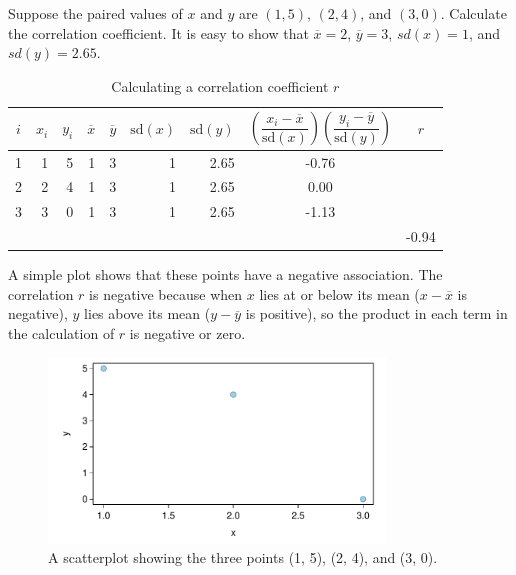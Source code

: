 \begin{example}{Suppose the paired values of $x$ and $y$ are $(1,5)$, $(2,4)$, and $(3,0)$. Calculate the correlation coefficient.} It is easy to show that $\overline{x} = 2$, $\overline{y} = 3$, $sd(x) = 1$, and $sd(y) = 2.65$. 
    
    \begin{table}[h]
        \centering
        \begin{tabular}{crrrrrrcc}
            \hline
        $i$ &   $x_i$ & $y_i$ & $\overline{x}$ & $\overline{y}$ & $\text{sd}(x)$ & $\text{sd}(y)$  & $\left(\dfrac{x_i - \overline{x}}{\text{sd}(x)}\right)
	\left(\dfrac{y_i - \overline{y}}{\text{sd}(y)}\right)$ & $r$\\
            \hline
             1 &  1 & 5 &  1 & 3 &  1 &  2.65 &  -0.76 &    \\
			  2 &  2 & 4 &  1 & 3 &  1 &  2.65 &  0.00 &        \\
			   3 &  3 & 0 &  1 & 3 &  1 &  2.65 &  -1.13 &    \\
			   &  &  &  &  &   &   &   &    -0.94  \\
            \hline
        \end{tabular}
        \caption{Calculating a correlation coefficient $r$}
        \label{table:corCalcSimple}
    \end{table}
    
A simple plot shows that these points have a negative association.  The correlation $r$ is negative because when $x$ lies at or below its mean ($x - \overline{x}$ is negative), $y$ lies above its mean ($y - \overline{y}$ is positive), so the product in each term in the calculation of $r$ is negative or zero. 

\begin{figure}[h]
	\centering
	\includegraphics[width=0.8\textwidth]
	{ch_intro_to_data_oi_biostat/figures/corCalcSimple/corCalcSimple.pdf}
	\caption{A scatterplot showing the three points (1, 5), (2, 4), and (3, 0).} 
	\label{fig:corCalcSimple}
\end{figure}
 
\end{example}

